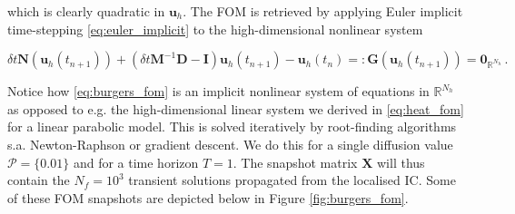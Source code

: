 \documentclass[../main.tex]{subfiles}
\begin{document}
which is clearly quadratic in $\boldsymbol{u}_{h}$.
The FOM is retrieved by applying Euler implicit time-stepping \eqref{eq:euler_implicit} to the high-dimensional nonlinear system

\begin{equation}\label{eq:burgers_fom}
     \delta t \boldsymbol{N}(\boldsymbol{u}_{h}(t_{n+1})) + (\delta t \boldsymbol{M}^{-1}\boldsymbol{D}-\boldsymbol{I})\boldsymbol{u}_{h}(t_{n+1}) - \boldsymbol{u}_{h}(t_{n}) =: \boldsymbol{G}(\boldsymbol{u}_{h}(t_{n+1})) = \boldsymbol{0}_{\mathbb{R}^{N_{h}}} \,.
\end{equation}

Notice how \eqref{eq:burgers_fom} is an implicit nonlinear system of equations in $\mathbb{R}^{N_{h}}$ as opposed to e.g. the high-dimensional linear system we derived in \eqref{eq:heat_fom} for a linear parabolic model. 
This is solved iteratively by root-finding algorithms s.a. Newton-Raphson or gradient descent.
We do this for a single diffusion value $\mathcal{P}=\{0.01\}$ and for a time horizon $T=1$.
The snapshot matrix $\boldsymbol{X}$ will thus contain the $N_{f}=10^{3}$ transient solutions propagated from the localised IC.
Some of these FOM snapshots are depicted below in Figure \ref{fig:burgers_fom}.
\end{document}
